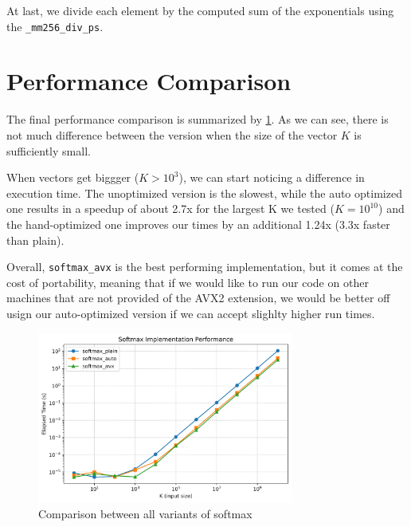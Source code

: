 \documentclass[12pt,a4paper]{article}
\begin{document}
At last, we divide each element by the computed sum of the exponentials using the \texttt{\_mm256\_div\_ps}.

\section{Performance Comparison}
The final performance comparison is summarized by \cref{fig:comparison}. As we can see, there is not much difference between the version when the size of the vector $K$ is sufficiently small. 

When vectors get biggger ($K > 10^3$), we can start noticing a difference in execution time. The unoptimized version is the slowest, while the auto optimized one results in a speedup of about 2.7x for the largest K we tested ($K = 10^{10}$) and the hand-optimized one improves our times by an additional 1.24x (3.3x faster than plain).

Overall, \texttt{softmax\_avx} is the best performing implementation, but it comes at the cost of portability, meaning that if we would like to run our code on other machines that are not provided of the AVX2 extension, we would be better off usign our auto-optimized version if we can accept slighlty higher run times.


\begin{figure}[h]
    \centering
    \includegraphics[width=0.75\textwidth]{notebooks/rep1_softmax_performance.png} 
    \caption{Comparison between all variants of softmax}   
    \label{fig:comparison}
\end{figure}
\end{document}
